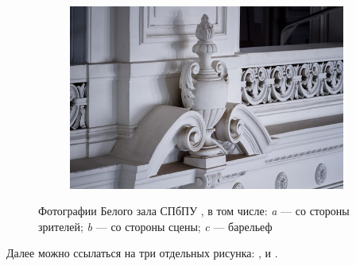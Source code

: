 \begin{figure}[!htbp]
	\begin{subfigure}[t]{\dimexpr.3\linewidth-1.3em\relax}
		\centering
		\includegraphics[width=.95\linewidth,valign=t]{my_folder/images//spbpu_whitehall_sculpture}
	\end{subfigure}%
\captionsetup{justification=centering} %
	\caption{Фотографии Белого зала СПбПУ \cite{spbpu-gallery}, в том числе: {\itshape a} --- со стороны зрителей; {\itshape b} --- со стороны сцены; {\itshape c} --- барельеф}\label{fig:spbpu_whitehall-three-photos}  
\end{figure}

Далее можно ссылаться на три отдельных рисунка: ,  и .